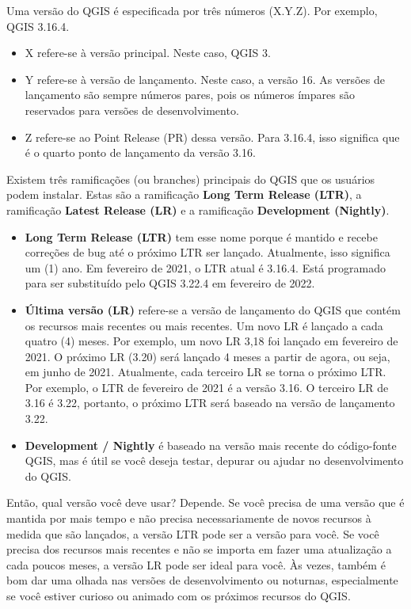 \documentclass[
]{krantz}
\providecommand{\tightlist}{%
  \setlength{\itemsep}{0pt}\setlength{\parskip}{0pt}}
\begin{document}
Uma versão do QGIS é especificada por três números (X.Y.Z). Por exemplo, QGIS 3.16.4.

\begin{itemize}
\tightlist
\item
  X refere-se à versão principal. Neste caso, QGIS 3.
\item
  Y refere-se à versão de lançamento. Neste caso, a versão 16. As versões de lançamento são sempre números pares, pois os números ímpares são reservados para versões de desenvolvimento.
\item
  Z refere-se ao Point Release (PR) dessa versão. Para 3.16.4, isso significa que é o quarto ponto de lançamento da versão 3.16.
\end{itemize}

Existem três ramificações (ou branches) principais do QGIS que os usuários podem instalar. Estas são a ramificação \textbf{Long Term Release (LTR)}, a ramificação \textbf{Latest Release (LR)} e a ramificação \textbf{Development (Nightly)}.

\begin{itemize}
\tightlist
\item
  \textbf{Long Term Release (LTR)} tem esse nome porque é mantido e recebe correções de bug até o próximo LTR ser lançado. Atualmente, isso significa um (1) ano. Em fevereiro de 2021, o LTR atual é 3.16.4. Está programado para ser substituído pelo QGIS 3.22.4 em fevereiro de 2022.
\item
  \textbf{Última versão (LR)} refere-se a versão de lançamento do QGIS que contém os recursos mais recentes ou mais recentes. Um novo LR é lançado a cada quatro (4) meses. Por exemplo, um novo LR 3,18 foi lançado em fevereiro de 2021. O próximo LR (3.20) será lançado 4 meses a partir de agora, ou seja, em junho de 2021. Atualmente, cada terceiro LR se torna o próximo LTR. Por exemplo, o LTR de fevereiro de 2021 é a versão 3.16. O terceiro LR de 3.16 é 3.22, portanto, o próximo LTR será baseado na versão de lançamento 3.22.
\item
  \textbf{Development / Nightly} é baseado na versão mais recente do código-fonte QGIS, mas é útil se você deseja testar, depurar ou ajudar no desenvolvimento do QGIS.
\end{itemize}

Então, qual versão você deve usar? Depende. Se você precisa de uma versão que é mantida por mais tempo e não precisa necessariamente de novos recursos à medida que são lançados, a versão LTR pode ser a versão para você. Se você precisa dos recursos mais recentes e não se importa em fazer uma atualização a cada poucos meses, a versão LR pode ser ideal para você. Às vezes, também é bom dar uma olhada nas versões de desenvolvimento ou noturnas, especialmente se você estiver curioso ou animado com os próximos recursos do QGIS.
\end{document}
